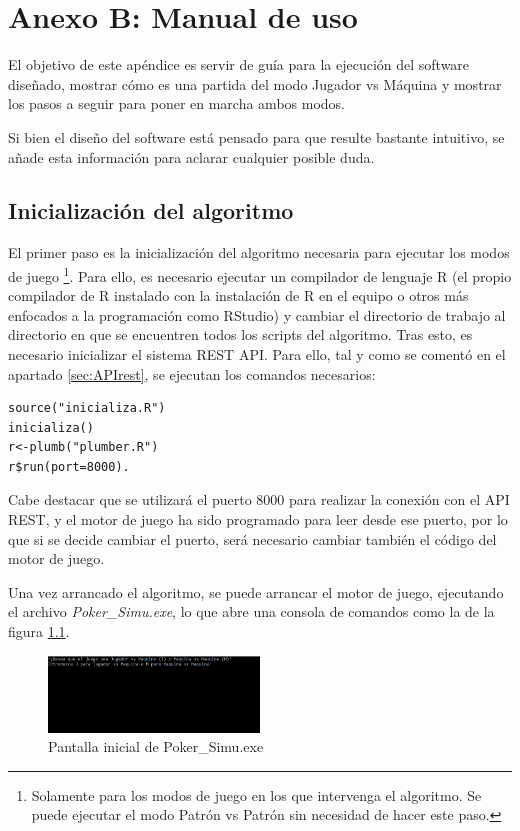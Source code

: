 \chapter{Anexo B: Manual de uso}
\label{ch:anexoc}

El objetivo de este apéndice es servir de guía para la ejecución del software diseñado, mostrar cómo es una partida del modo Jugador vs Máquina y mostrar los pasos a seguir para poner en marcha ambos modos.

Si bien el diseño del software está pensado para que resulte bastante intuitivo, se añade esta información para aclarar cualquier posible duda.


\section{Inicialización del algoritmo}

El primer paso es la inicialización del algoritmo necesaria para ejecutar los modos de juego \footnote{Solamente para los modos de juego en los que intervenga el algoritmo. Se puede ejecutar el modo Patrón vs Patrón sin necesidad de hacer este paso.}. Para ello, es necesario ejecutar un compilador de lenguaje R (el propio compilador de R instalado con la instalación de R en el equipo o otros más enfocados a la programación como RStudio) y cambiar el directorio de trabajo al directorio en que se encuentren todos los scripts del algoritmo. Tras esto, es necesario inicializar el sistema REST API. Para ello, tal y como se comentó en el apartado \ref{sec:APIrest}, se ejecutan los comandos necesarios:

\begin{verbatim}
source("inicializa.R")
inicializa()
r<-plumb("plumber.R")
r$run(port=8000).
\end{verbatim}

Cabe destacar que se utilizará el puerto 8000 para realizar la conexión con el API REST, y el motor de juego ha sido programado para leer desde ese puerto, por lo que si se decide cambiar el puerto, será necesario cambiar también el código del motor de juego.

Una vez arrancado el algoritmo, se puede arrancar el motor de juego, ejecutando el archivo \textit{Poker\_Simu.exe}, lo que abre una consola de comandos como la de la figura \ref{fig:C_ini}.

\begin{figure}[h]
\centering
\includegraphics[width=0.5\textwidth]{figuras/C_ini.png}   
\caption{Pantalla inicial de Poker\_Simu.exe}
\label{fig:C_ini}
\end{figure}

